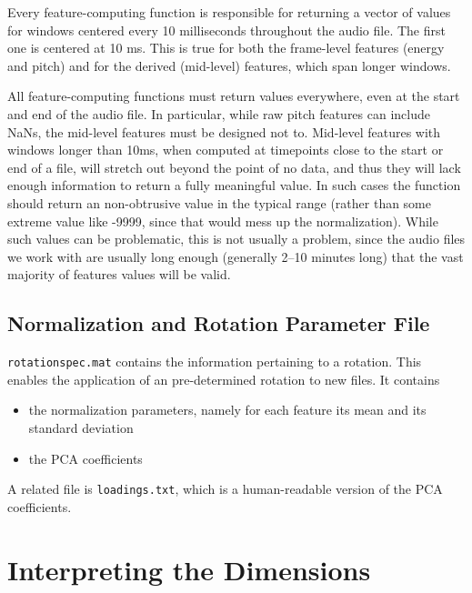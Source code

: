 \documentclass[11pt]{article}
\begin{document}
Every feature-computing function is responsible for returning a vector
of values for windows centered every 10 milliseconds throughout the
audio file.  The first one is centered at 10 ms.  This is true for
both the frame-level features (energy and pitch) and for the derived
(mid-level) features, which span longer windows.  

All feature-computing functions must return values everywhere, even at
the start and end of the audio file.  In particular, while raw pitch
features can include NaNs, the mid-level features must be designed not
to. Mid-level features with windows longer than 10ms, when computed at
timepoints close to the start or end of a file, will stretch out
beyond the point of no data, and thus they will lack enough
information to return a fully meaningful value.  In such cases the
function should return an non-obtrusive value in the typical range
(rather than some extreme value like -9999, since that would mess up
the normalization).  While such values can be problematic, this is not
usually a problem, since the audio files we work with are usually long
enough (generally 2--10 minutes long) that the vast majority of
features values will be valid.


\subsection{Normalization and Rotation Parameter File}

{\tt rotationspec.mat}  contains the information pertaining to a
rotation.  This enables the application of an pre-determined rotation 
to new files.  It contains 

\begin{itemize}  \setlength{\itemsep}{0pt}\setlength{\parskip}{0pt}
\item the normalization parameters, namely for each feature its mean
  and its standard deviation

\item the PCA coefficients
\end{itemize}

A related file is {\tt loadings.txt}, which is a human-readable
version of the PCA coefficients.


\section{Interpreting the Dimensions}  \label{sec:interpreting}
\end{document}
